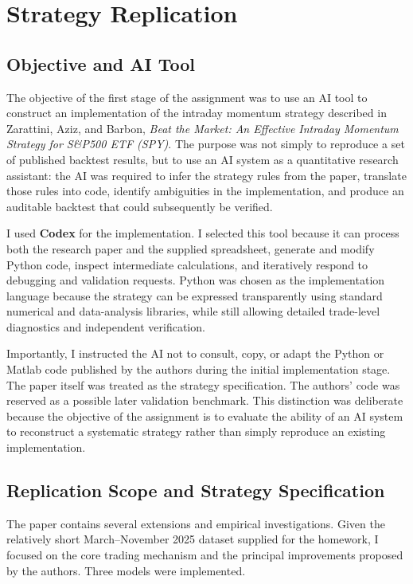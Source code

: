\documentclass{article}
\begin{document}
\section{Strategy Replication}
\label{sec:implementation}

\subsection{Objective and AI Tool}

The objective of the first stage of the assignment was to use an AI tool to construct an implementation of the intraday momentum strategy described in Zarattini, Aziz, and Barbon, \textit{Beat the Market: An Effective Intraday Momentum Strategy for S\&P500 ETF (SPY)}. The purpose was not simply to reproduce a set of published backtest results, but to use an AI system as a quantitative research assistant: the AI was required to infer the strategy rules from the paper, translate those rules into code, identify ambiguities in the implementation, and produce an auditable backtest that could subsequently be verified.

I used \textbf{Codex} for the implementation. I selected this tool because it can process both the research paper and the supplied spreadsheet, generate and modify Python code, inspect intermediate calculations, and iteratively respond to debugging and validation requests. Python was chosen as the implementation language because the strategy can be expressed transparently using standard numerical and data-analysis libraries, while still allowing detailed trade-level diagnostics and independent verification.

Importantly, I instructed the AI not to consult, copy, or adapt the Python or Matlab code published by the authors during the initial implementation stage. The paper itself was treated as the strategy specification. The authors' code was reserved as a possible later validation benchmark. This distinction was deliberate because the objective of the assignment is to evaluate the ability of an AI system to reconstruct a systematic strategy rather than simply reproduce an existing implementation.

\subsection{Replication Scope and Strategy Specification}

The paper contains several extensions and empirical investigations. Given the relatively short March--November 2025 dataset supplied for the homework, I focused on the core trading mechanism and the principal improvements proposed by the authors. Three models were implemented.
\end{document}
